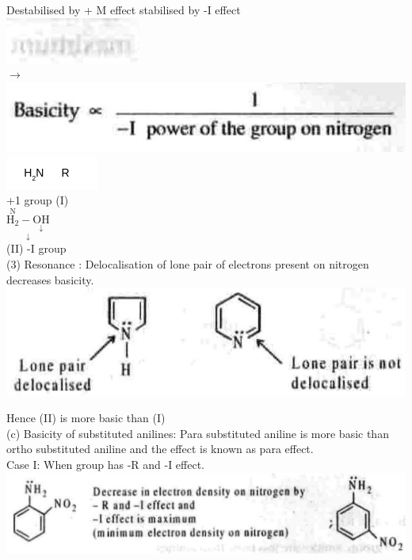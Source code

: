 \documentclass[10pt]{article}
\begin{document}
Destabilised by + M effect stabilised by -I effect\\
\includegraphics[max width=\textwidth, center]{2025_01_28_8470952b98110cec3aabg-078}\\
$\rightarrow$\\
\includegraphics[max width=\textwidth, center]{2025_01_28_8470952b98110cec3aabg-079}\\
\includegraphics{smile-0c0922efe9c1ac86841171b7fe895453dc5f4bb0}\\
+1 group (I)\\
$\underset{\downarrow}{\stackrel{\mathrm{N}}{\mathrm{H}_{2}}-\underset{\downarrow}{\mathrm{OH}}}$\\
(II) -I group\\
(3) Resonance : Delocalisation of lone pair of electrons present on nitrogen decreases basicity.\\
\includegraphics[max width=\textwidth, center]{2025_01_28_8470952b98110cec3aabg-079(2)}

Hence (II) is more basic than (I)\\
(c) Basicity of substituted anilines: Para substituted aniline is more basic than ortho substituted aniline and the effect is known as para effect.\\
Case I: When group has -R and -I effect.\\
\includegraphics[max width=\textwidth, center]{2025_01_28_8470952b98110cec3aabg-079(1)}
\end{document}
